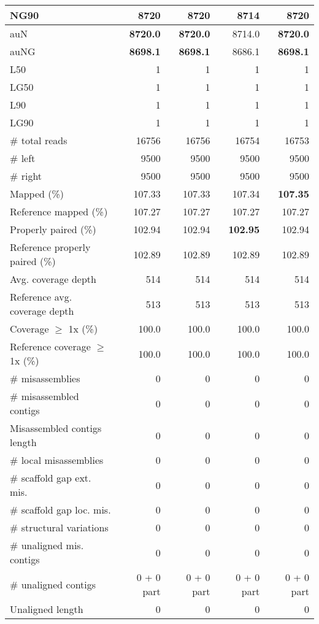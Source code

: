 \documentclass[12pt,a4paper]{article}
\begin{document}
\begin{table}[ht]
\begin{center}
\begin{tabular}{|l*{4}{|r}|}
NG90 & {\bf 8720} & {\bf 8720} & 8714 & {\bf 8720} \\ \hline
auN & {\bf 8720.0} & {\bf 8720.0} & 8714.0 & {\bf 8720.0} \\ \hline
auNG & {\bf 8698.1} & {\bf 8698.1} & 8686.1 & {\bf 8698.1} \\ \hline
L50 & 1 & 1 & 1 & 1 \\ \hline
LG50 & 1 & 1 & 1 & 1 \\ \hline
L90 & 1 & 1 & 1 & 1 \\ \hline
LG90 & 1 & 1 & 1 & 1 \\ \hline
\# total reads & 16756 & 16756 & 16754 & 16753 \\ \hline
\# left & 9500 & 9500 & 9500 & 9500 \\ \hline
\# right & 9500 & 9500 & 9500 & 9500 \\ \hline
Mapped (\%) & 107.33 & 107.33 & 107.34 & {\bf 107.35} \\ \hline
Reference mapped (\%) & 107.27 & 107.27 & 107.27 & 107.27 \\ \hline
Properly paired (\%) & 102.94 & 102.94 & {\bf 102.95} & 102.94 \\ \hline
Reference properly paired (\%) & 102.89 & 102.89 & 102.89 & 102.89 \\ \hline
Avg. coverage depth & 514 & 514 & 514 & 514 \\ \hline
Reference avg. coverage depth & 513 & 513 & 513 & 513 \\ \hline
Coverage $\geq$ 1x (\%) & 100.0 & 100.0 & 100.0 & 100.0 \\ \hline
Reference coverage $\geq$ 1x (\%) & 100.0 & 100.0 & 100.0 & 100.0 \\ \hline
\# misassemblies & 0 & 0 & 0 & 0 \\ \hline
\# misassembled contigs & 0 & 0 & 0 & 0 \\ \hline
Misassembled contigs length & 0 & 0 & 0 & 0 \\ \hline
\# local misassemblies & 0 & 0 & 0 & 0 \\ \hline
\# scaffold gap ext. mis. & 0 & 0 & 0 & 0 \\ \hline
\# scaffold gap loc. mis. & 0 & 0 & 0 & 0 \\ \hline
\# structural variations & 0 & 0 & 0 & 0 \\ \hline
\# unaligned mis. contigs & 0 & 0 & 0 & 0 \\ \hline
\# unaligned contigs & 0 + 0 part & 0 + 0 part & 0 + 0 part & 0 + 0 part \\ \hline
Unaligned length & 0 & 0 & 0 & 0 \\ \hline

\end{tabular}
\end{center}
\end{table}
\end{document}
